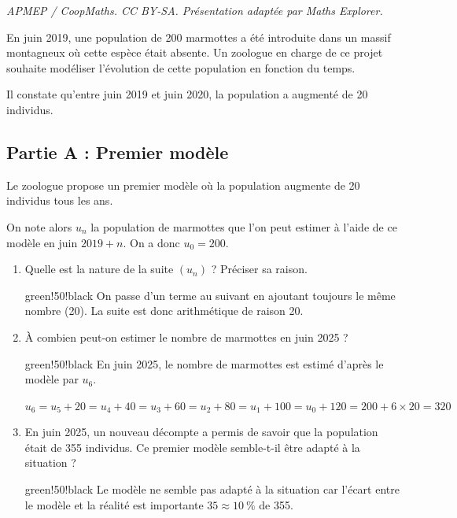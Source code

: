\documentclass[10pt]{article}
\begin{document}
\noindent\textit{APMEP / CoopMaths. CC BY-SA. Présentation adaptée par Maths Explorer.}\par\medskip
En juin 2019, une population de 200 marmottes a été introduite dans un massif montagneux où cette espèce était absente. Un zoologue en charge de ce projet souhaite modéliser l'évolution de cette population en fonction du temps.
	
	Il constate qu'entre juin 2019 et juin 2020, la population a augmenté de 20 individus.
	
	\subsection*{Partie A : Premier modèle}
	
	Le zoologue propose un premier modèle où la population augmente de 20 individus tous les ans.
	
	On note alors $u_{n}$ la population de marmottes que l'on peut estimer à l'aide de ce modèle en juin $2019+n$. On a donc $u_{0}=200$.
	
	\begin{enumerate}
		\item Quelle est la nature de la suite $\left(u_{n}\right)$ ? Préciser sa raison.
		
		\begin{color}{green!50!black}
		On passe d'un terme au suivant en ajoutant toujours le même nombre (20). La suite est donc arithmétique de raison 20.
		\end{color}
		
		\item À combien peut-on estimer le nombre de marmottes en juin 2025 ?
		
		\begin{color}{green!50!black}
		En juin 2025, le nombre de marmottes est estimé d'après le modèle par $u_6$.
		
		$u_6 = u_5 + 20 = u_4 + 40 = u_3 + 60 =  u_2 + 80 = u_1 + 100 =  u_0 + 120 = 200 + 6\times 20 = 320$
		\end{color}
		
		\item En juin 2025, un nouveau décompte a permis de savoir que la population était de 355 individus. Ce premier modèle semble-t-il être adapté à la situation ?

		\begin{color}{green!50!black}
		Le modèle ne semble pas adapté à la situation car l'écart entre le modèle et la réalité est importante $35\approx 10~\%$ de 355.
		\end{color}
	\end{enumerate}
	
\end{document}
